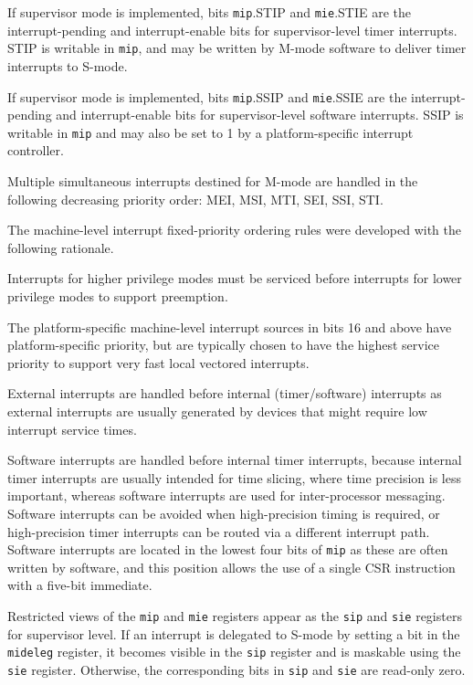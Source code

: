 If supervisor mode is implemented, bits {\tt mip}.STIP and {\tt mie}.STIE
are the interrupt-pending and interrupt-enable bits for supervisor-level
timer interrupts.
STIP is writable in {\tt mip}, and may be
written by M-mode software to deliver timer interrupts to S-mode.

If supervisor mode is implemented, bits {\tt mip}.SSIP and {\tt mie}.SSIE
are the interrupt-pending and interrupt-enable bits for supervisor-level
software interrupts.
SSIP is writable in {\tt mip} and may also be set to 1 by a platform-specific
interrupt controller.

Multiple simultaneous
interrupts destined for M-mode are handled in the following
decreasing priority order: MEI, MSI, MTI, SEI, SSI, STI.

\begin{commentary}
  The machine-level interrupt fixed-priority ordering rules were developed
  with the following rationale.

  Interrupts for higher privilege modes must be serviced before
  interrupts for lower privilege modes to support preemption.

  The platform-specific machine-level interrupt sources in bits 16 and above
  have platform-specific priority, but are typically chosen to have the
  highest service priority to support very fast local vectored interrupts.

  External interrupts are handled before internal (timer/software)
  interrupts as external interrupts are usually generated by devices
  that might require low interrupt service times.

  Software interrupts are handled before internal timer interrupts,
  because internal timer interrupts are usually intended for time
  slicing, where time precision is less important, whereas software
  interrupts are used for inter-processor messaging.  Software
  interrupts can be avoided when high-precision timing is required, or
  high-precision timer interrupts can be routed via a different
  interrupt path.
  Software interrupts are located in the lowest four bits of {\tt mip}
  as these are often written by software, and this position allows the
  use of a single CSR instruction with a five-bit immediate.
\end{commentary}

Restricted views of the {\tt mip} and {\tt mie} registers appear as
the {\tt sip} and {\tt sie} registers for supervisor level.
If an interrupt is delegated to
S-mode by setting a bit in the {\tt mideleg} register,
it becomes visible in the {\tt sip} register and is maskable
using the {\tt sie} register.  Otherwise, the corresponding
bits in {\tt sip} and {\tt sie} are read-only
zero.

